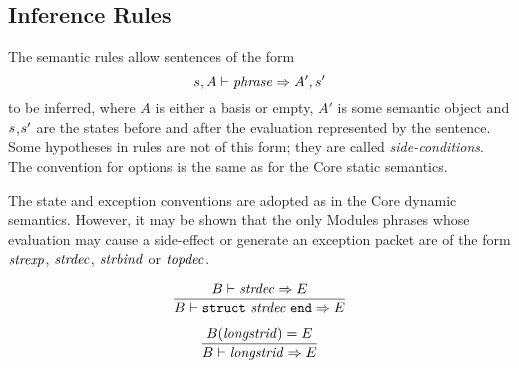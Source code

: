 \subsection{Inference Rules}
The semantic rules allow sentences  of the form
\[ s,A\vdash{\it phrase}\Rightarrow A',s' \]
to be inferred, where $A$ is either a basis or empty,
$A'$ is some semantic
object and $s$,$s'$ are the states before and after the evaluation
represented by the sentence.  Some hypotheses in rules are not of this form;
they are called {\sl side-conditions}.  The convention for options is
the same as for the Core static semantics.  

The state and exception conventions are adopted as in the Core dynamic
semantics.  However, it may be shown that the only Modules phrases whose 
evaluation
may cause a side-effect or generate an exception packet are of the form
${\it strexp}$, ${\it strdec}$, ${\it strbind}$ or ${\it topdec}$.

%
%
\begin{equation}        %
\frac{\B\ts\strdec\ra\E}
     {\B\ts\encstrexp\ra\E}\index{60.1}
\end{equation}

\begin{equation}        %
\frac{\B(\longstrid)=\E}
     {\B\ts\longstrid\ra\E}
\end{equation}

\insertion{\theconstructors}{\begin{equation}        %
\frac{\B\ts\strexp\ra\E\qquad\Inter\B\ts\sigexp\ra\I}
     {\B\ts\transpconstraint\ra\E\downarrow\I}
\end{equation}

\begin{equation}        %
\frac{\B\ts\strexp\ra\E\qquad\Inter\B\ts\sigexp\ra\I}
     {\B\ts\opaqueconstraint\ra\E\downarrow\I}
\end{equation}}

